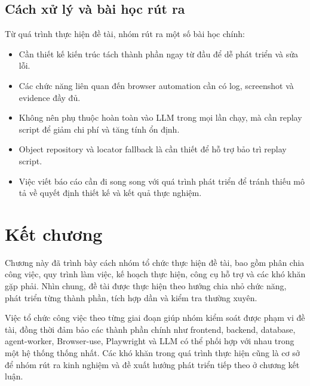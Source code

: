 \subsection{Cách xử lý và bài học rút ra}

Từ quá trình thực hiện đề tài, nhóm rút ra một số bài học chính:

\begin{itemize}
    \item Cần thiết kế kiến trúc tách thành phần ngay từ đầu để dễ phát triển và sửa lỗi.
    \item Các chức năng liên quan đến browser automation cần có log, screenshot và evidence đầy đủ.
    \item Không nên phụ thuộc hoàn toàn vào LLM trong mọi lần chạy, mà cần replay script để giảm chi phí và tăng tính ổn định.
    \item Object repository và locator fallback là cần thiết để hỗ trợ bảo trì replay script.
    \item Việc viết báo cáo cần đi song song với quá trình phát triển để tránh thiếu mô tả về quyết định thiết kế và kết quả thực nghiệm.
\end{itemize}

\section{Kết chương}

Chương này đã trình bày cách nhóm tổ chức thực hiện đề tài, bao gồm phân chia công việc, quy trình làm việc, kế hoạch thực hiện, công cụ hỗ trợ và các khó khăn gặp phải. Nhìn chung, đề tài được thực hiện theo hướng chia nhỏ chức năng, phát triển từng thành phần, tích hợp dần và kiểm tra thường xuyên.

Việc tổ chức công việc theo từng giai đoạn giúp nhóm kiểm soát được phạm vi đề tài, đồng thời đảm bảo các thành phần chính như frontend, backend, database, agent-worker, Browser-use, Playwright và LLM có thể phối hợp với nhau trong một hệ thống thống nhất. Các khó khăn trong quá trình thực hiện cũng là cơ sở để nhóm rút ra kinh nghiệm và đề xuất hướng phát triển tiếp theo ở chương kết luận.